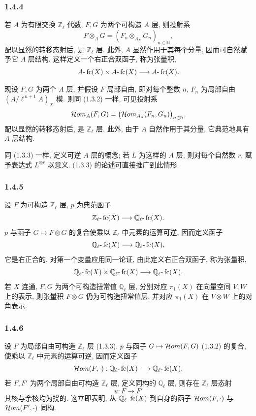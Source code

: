 \subsubsection*{1.4.4}
若 \(A\) 为有限交换 \(\mathbb Z_\ell\) 代数, \(F,G\) 为两个可构造 \(A\) 层, 则投射系
\[
F\otimes_A G=(F_n\otimes_{A_X} G_n)_{n\in\mathbb N},
\]
配以显然的转移态射后, 是 \(\mathbb Z_\ell\) 层. 此外, \(A\) 显然作用于其每个分量, 因而可自然赋予它 \(A\) 层结构. 这样定义一个右正合双函子, 称为张量积,
\[
A\text{-}\operatorname{fc}(X)\times A\text{-}\operatorname{fc}(X)\longrightarrow A\text{-}\operatorname{fc}(X).
\]

现设 \(F,G\) 为两个 \(A\) 层, 并假设 \(F\) 局部自由, 即对每个整数 \(n\), \(F_n\) 为局部自由 \((A/\ell^{\,n+1}A)_X\) 模. 则同 (1.3.2) 一样, 可见投射系
\[
\mathcal{H}om_A(F,G)=\bigl(\mathcal{H}om_{A_n}(F_n,G_n)\bigr)_{n\in\mathbb N},
\]
配以显然的转移态射后, 是 \(\mathbb Z_\ell\) 层. 此外, 由于 \(A\) 自然作用于其分量, 它典范地具有 \(A\) 层结构.

同 (1.3.3) 一样, 定义可逆 \(A\) 层的概念; 若 \(L\) 为这样的 \(A\) 层, 则对每个自然数 \(r\), 赋予表达式 \(L^{\otimes r}\) 以意义. (1.3.3) 的论述可直接推广到此情形.

\subsubsection*{1.4.5}
设 \(F\) 为可构造 \(\mathbb Z_\ell\) 层, \(p\) 为典范函子
\[
\mathbb Z_\ell\text{-}\operatorname{fc}(X)\longrightarrow \mathbb Q_\ell\text{-}\operatorname{fc}(X).
\]
\(p\) 与函子 \(G\mapsto F\otimes G\) 的复合使乘以 \(\mathbb Z_\ell\) 中元素的运算可逆, 因而定义函子
\[
\mathbb Q_\ell\text{-}\operatorname{fc}(X)\longrightarrow \mathbb Q_\ell\text{-}\operatorname{fc}(X),
\]
它是右正合的. 对第一个变量应用同一论证, 由此定义右正合双函子, 称为张量积,
\[
\mathbb Q_\ell\text{-}\operatorname{fc}(X)\times \mathbb Q_\ell\text{-}\operatorname{fc}(X)
\longrightarrow \mathbb Q_\ell\text{-}\operatorname{fc}(X).
\]
若 \(X\) 连通, \(F,G\) 为两个可构造扭常值 \(\mathbb Q_\ell\) 层, 分别对应 \(\pi_1(X)\) 在向量空间 \(V,W\) 上的表示, 则张量积 \(F\otimes G\) 仍为可构造扭常值层, 并对应 \(\pi_1(X)\) 在 \(V\otimes W\) 上的对角表示.

\subsubsection*{1.4.6}
设 \(F\) 为局部自由可构造 \(\mathbb Z_\ell\) 层 (1.3.3). \(p\) 与函子 \(G\mapsto\mathcal{H}om(F,G)\) (1.3.2) 的复合, 使乘以 \(\mathbb Z_\ell\) 中元素的运算可逆, 因而定义函子
\[
\mathcal{H}om(F,\cdot):\mathbb Q_\ell\text{-}\operatorname{fc}(X)\longrightarrow \mathbb Q_\ell\text{-}\operatorname{fc}(X).
\]
若 \(F,F'\) 为两个局部自由可构造 \(\mathbb Z_\ell\) 层, 定义同构的 \(\mathbb Q_\ell\) 层, 则存在 \(\mathbb Z_\ell\) 层态射
\[
u:F\longrightarrow F'
\]
其核与余核均为挠的. 这立即表明, 从 \(\mathbb Q_\ell\text{-}\operatorname{fc}(X)\) 到自身的函子 \(\mathcal{H}om(F,\cdot)\) 与 \(\mathcal{H}om(F',\cdot)\) 同构.

